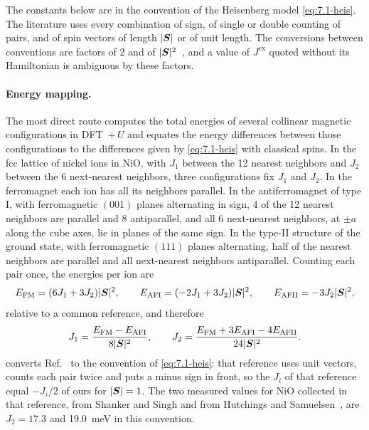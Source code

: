 The constants below are in the convention of the Heisenberg model \cref{eq:7.1-heis}. The literature uses every combination of sign, of single or double counting of pairs, and of spin vectors of length $|\bm{S}|$ or of unit length. The conversions between conventions are factors of 2 and of $|\bm{S}|^2$~\cite[Table~1]{he2021tb2j}, and a value of $J^{\mathrm{ex}}$ quoted without its Hamiltonian is ambiguous by these factors.

\paragraph{Energy mapping.} The most direct route computes the total energies of several collinear magnetic configurations in DFT~$+\,U$ and equates the energy differences between those configurations to the differences given by \cref{eq:7.1-heis} with classical spins. In the fcc lattice of nickel ions in NiO, with $J_1$ between the 12 nearest neighbors and $J_2$ between the 6 next-nearest neighbors, three configurations fix $J_1$ and $J_2$. In the ferromagnet each ion has all its neighbors parallel. In the antiferromagnet of type I, with ferromagnetic $(001)$ planes alternating in sign, 4 of the 12 nearest neighbors are parallel and 8 antiparallel, and all 6 next-nearest neighbors, at $\pm a$ along the cube axes, lie in planes of the same sign. In the type-II structure of the ground state, with ferromagnetic $(111)$ planes alternating, half of the nearest neighbors are parallel and all next-nearest neighbors antiparallel. Counting each pair once, the energies per ion are
\begin{equation}
  E_{\mathrm{FM}} = (6J_1 + 3J_2)|\bm{S}|^2, \qquad E_{\mathrm{AFI}} = (-2J_1 + 3J_2)|\bm{S}|^2, \qquad E_{\mathrm{AFII}} = -3J_2|\bm{S}|^2 ,
  \label{eq:E.9-map}
\end{equation}
relative to a common reference, and therefore
\begin{equation}
  J_1 = \frac{E_{\mathrm{FM}} - E_{\mathrm{AFI}}}{8|\bm{S}|^2}, \qquad J_2 = \frac{E_{\mathrm{FM}} + 3E_{\mathrm{AFI}} - 4E_{\mathrm{AFII}}}{24|\bm{S}|^2} .
  \label{eq:E.9-J12}
\end{equation}
 converts Ref.~\cite[Eqs.~(6) and~(7)]{fischer2009exchange} to the convention of \cref{eq:7.1-heis}: that reference uses unit vectors, counts each pair twice and puts a minus sign in front, so the $J_i$ of that reference equal $-J_i/2$ of ours for $|\bm{S}| = 1$. The two measured values for NiO collected in that reference, from Shanker and Singh and from Hutchings and Samuelsen~\cite{hutchings1972measurement}, are $J_2 = 17.3$ and \SI{19.0}{meV} in this convention.

